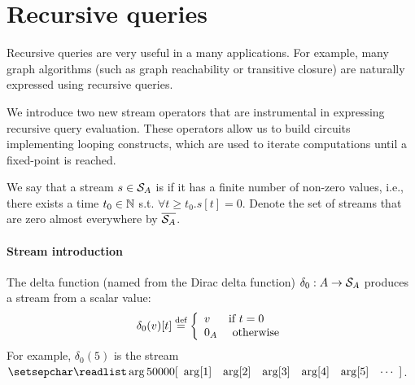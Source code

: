 \section{Recursive queries}\label{sec:recursion}

Recursive queries are very useful in a many applications.
For example, many graph algorithms (such as graph reachability
or transitive closure) are naturally expressed using recursive queries.

We introduce two new stream operators that are instrumental in
expressing recursive query evaluation.  These operators allow us
to build circuits implementing looping constructs, which 
are used to iterate computations until a fixed-point is reached.

\begin{definition}\label{def:zae}
We say that a stream $s \in \mathcal{S}_{A}$ is  if it has a finite 
number of non-zero values, i.e., there exists a time $t_0 \in \mathbb{N}$
s.t. $\forall t \geq t_0 . s[t] = 0$.
\noindent Denote the set of streams that are zero almost everywhere
by $\overline{\mathcal{S}_{A}}$.
\end{definition}

\paragraph{Stream introduction}

The delta function (named from the Dirac delta function) $\delta_0 : A \rightarrow \mathcal{S}_{A}$
produces a stream from a scalar value:
$$\delta_0(v)[t] \stackrel{\textrm{\scriptsize def}}{=} \left\{
\begin{array}{ll}
  v & \mbox{if } t = 0 \\
  0_A & \mbox{ otherwise}
\end{array}
\right.
$$
\ifstreamexamples
For example, $\delta_0(5)$ is the stream $\sv{5 0 0 0 0}$.
\fi

